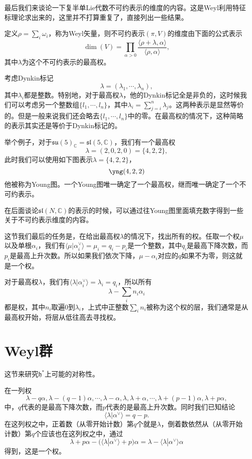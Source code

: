 \documentclass[9pt]{extarticle}
\newcommand{\cc}{\mathbb{C}}
\begin{document}
\para 最后我们来谈论一下复半单Lie代数不可约表示的维度的内容。这是Weyl利用特征标理论求出来的，这里并不打算重复了，直接列出一些结果。

定义$\rho=\sum_i \omega_i$，称为Weyl矢量，则不可约表示$(\pi,V)$的维度由下面的公式表示
\[
	\dim(V)=\prod_{\alpha>0}\frac{\langle \rho+\lambda,\alpha\rangle}{\langle \rho,\alpha\rangle},
\]
其中$\lambda$为这个不可约表示的最高权。

\para 考虑Dynkin标记
\[
	\lambda=(\lambda_1,\cdots,\lambda_n),
\]
其中$\lambda_i$都是整数。特别地，对于最高权$\lambda$，他的Dynkin标记全是非负的，这时候我们可以考虑另一个整数组$\{l_1,\cdots,l_n\}$，其中$\lambda_i=\sum_{j=i}^n\lambda_j$。这两种表示是显然等价的。但是一般来说我们还会略去$\{l_1,\cdots,l_n\}$中的零。在最高权的情况下，这种简略的表示其实还是等价于Dynkin标记的。

举个例子，对于$\mathfrak{su}(5)_\cc=\mathfrak{sl}(5,\cc)$，我们有一个最高权
\[
	\lambda=(2,0,2,0)=\{4,2,2\},
\]
此时我们可以使用如下图表示$\lambda=\{4,2,2\}$，
\[
	\yng(4,2,2)
\]
他被称为Young图。一个Young图唯一确定了一个最高权，继而唯一确定了一个不可约表示。

在后面谈论$\mathfrak{sl}(N,\cc)$的表示的时候，可以通过往Young图里面填充数字得到一些关于不可约表示维度的内容。

\para 这节我们最后的任务是，在给出最高权$\lambda$的情况下，找出所有的权。任取一个权$\mu$以及单根$\alpha_i$，我们有$\langle\mu|\alpha^\vee_i\rangle=\mu_i=q_i-p_i$是一个整数，其中$q_i$是最高下降次数，而$p_i$是最高上升次数。所以如果我们依次下降，$\mu-\alpha_i$对应的$q$如果不为零，则这就是一个权。

对于最高权$\lambda$，我们有$\langle\lambda|\alpha^\vee_i\rangle=\lambda_i=q_i$，所以所有
\[
	\lambda-\sum_in_i\alpha_i
\]
都是权，其中$n_i$取遍$0$到$\lambda_i$，上式中正整数$\sum_i n_i$被称为这个权的层，我们通常是从最高权开始，将层从低往高去寻找权。

\section{Weyl群}

这节来研究$\mathfrak{h}^*$上可能的对称性。

\para 在一列权
\[
	\lambda-q\alpha,\lambda-(q-1)\alpha,\cdots,\lambda-\alpha,\lambda,\lambda+\alpha,\cdots,\lambda+(p-1)\alpha,\lambda+p\alpha,
\]
中，$q$代表的是最高下降次数，而$p$代表的是最高上升次数。同时我们已知结论
\[
	\langle \lambda | \alpha^\vee\rangle = q-p.
\]
在这列权之中，正着数（从零开始计数）第$q$个就是$\lambda$，倒着数依然从（从零开始计数）第$q$个应该也在这列权之中，通过
\[
	\lambda+p\alpha-(\langle \lambda | \alpha^\vee\rangle+p)\alpha =\lambda-\langle \lambda|\alpha^\vee\rangle\alpha
\]
得到，这是一个权。
\end{document}
